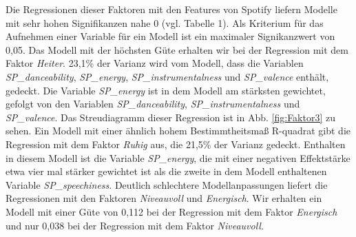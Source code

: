Die Regressionen dieser Faktoren mit den Features von Spotify liefern Modelle mit sehr hohen Signifikanzen nahe 0 (vgl. Tabelle 1).
Als Kriterium für das Aufnehmen einer Variable für ein Modell ist ein maximaler Signikanzwert von  0,05.  
Das Modell mit der höchsten Güte erhalten wir bei der Regression mit dem Faktor \textit{Heiter}.
23,1\% der Varianz wird vom Modell, dass die Variablen \textit{SP\_danceability}, \textit{SP\_energy}, \textit{SP\_instrumentalness} und \textit{SP\_valence} enthält, gedeckt.
Die Variable \textit{SP\_energy} ist in dem Modell am stärksten gewichtet, gefolgt von den Variablen \textit{SP\_danceability},  \textit{SP\_instrumentalness} und \textit{SP\_valence}.
Das Streudiagramm dieser Regression ist in Abb. \ref{fig:Faktor3} zu sehen.    
Ein Modell mit einer ähnlich hohem Bestimmtheitsmaß R-quadrat gibt die Regression mit dem Faktor \textit{Ruhig} aus, die 21,5\% der Varianz gedeckt.
Enthalten in diesem Modell ist die Variable \textit{SP\_energy}, die mit einer negativen Effektstärke etwa vier mal stärker gewichtet ist als die zweite in dem Modell enthaltenen Variable \textit{SP\_speechiness}.
Deutlich schlechtere Modellanpassungen liefert die Regressionen mit den Faktoren \textit{Niveauvoll} und \textit{Energisch}.
Wir erhalten ein Modell mit einer Güte von 0,112 bei der Regression mit dem Faktor \textit{Energisch} und nur 0,038 bei der Regression mit dem Faktor \textit{Niveauvoll}.


